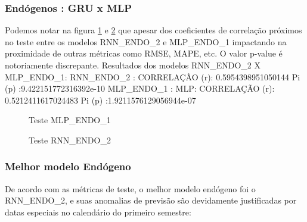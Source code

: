 \documentclass[	12pt, Times, openright, twoside, a4paper, english, brazil]{abntex2}
\begin{document}
    	    \subsubsection{Endógenos : GRU x MLP}
            Podemos notar na figura \ref{fig:case1_mlp_endo1_test} e \ref{fig:case1_rnn_endo2_test} que apesar dos coeficientes de correlação próximos no teste entre os modelos RNN\_ENDO\_2 e MLP\_ENDO\_1 impactando na proximidade de outras métricas como RMSE, MAPE, etc. O valor p-value é notoriamente discrepante.\newline
            Resultados dos modelos RNN\_ENDO\_2 X MLP\_ENDO\_1:\newline
            RNN\_ENDO\_2 : CORRELAÇÃO (r): 0.5954398951050144 Pi (p) :9.422151772316392e-10\newline
            MLP\_ENDO\_1 : MLP: CORRELAÇÃO (r): 0.5212411617024483 Pi (p) :1.9211576129056944e-07 \newline
            \begin{figure}[!ht]
              \caption{Teste MLP\_ENDO\_1 \label{fig:case1_mlp_endo1_test} }
            \end{figure}

            \begin{figure}[!ht]
              \caption{Teste RNN\_ENDO\_2 \label{fig:case1_rnn_endo2_test} }
            \end{figure}

    	    \subsubsection{Melhor modelo Endógeno}
            De acordo com as métricas de teste, o melhor modelo endógeno foi o RNN\_ENDO\_2, e suas anomalias de previsão são devidamente justificadas por datas especiais no calendário do primeiro semestre:
            
\end{document}
